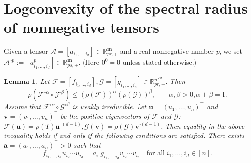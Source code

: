 \documentclass{amsart}
\newcommand{\R}{\mathbb{R}}
\newcommand{\m}{\mathbf{m}}
\newcommand{\uu}{\mathbf{u}}
\newcommand{\bv}{\mathbf{v}}
\newcommand{\0}{\mathbf{0}}
\newcommand{\1}{\mathbf{1}}
\newcommand{\cA}{\mathcal{A}}
\newcommand{\cF}{\mathcal{F}}
\newcommand{\cG}{\mathcal{G}}
\newcommand{\trans}{^\top}
\newtheorem{lemma}[theo]{Lemma}
\theoremstyle{remark}
\numberwithin{equation}{section} %
\renewcommand{\le}{\leqslant}
\begin{document}
%
 \section{Logconvexity of the spectral radius of nonnegative tensors}\label{sec:logconv}
  Given a tensor $\cA=[a_{i_1,\ldots,i_d}]\in \R_{pr,+}^{\m}$ and a real nonnegative number $p$, we set $\cA^{\circ p}:=[a_{i_1,\ldots,i_d}^p]\in \R_{ps,+}^{\m}$.
 (Here $0^0=0$ unless stated otherwise.)
 \begin{lemma}\label{genkinin}
 Let $\cF=[f_{i_1,\ldots,i_d}],\cG=[g_{i_1,\ldots,i_d}]\in\R_{pr,+}^{n^{\times d}}$.  Then
 \begin{equation}\label{genkinin1}
 \rho(\cF^{\circ \alpha}\circ\cG^{\circ\beta})\le (\rho(\cF))^\alpha (\rho(\cG))^\beta,\qquad  \alpha,\beta> 0, \alpha+\beta=1.
 \end{equation}
 Assume that $\cF^{\circ \alpha}\circ\cG^{\circ\beta}$ is weakly irreducible.  Let  $\uu=(u_1,\ldots,u_n)\trans$ and $\bv=(v_1,\ldots,v_n)\trans$ be the positive eigenvectors of $\cF$ and $\cG$: $\cF(\uu)=\rho(T)\uu^{\circ(d-1) }, \cG(\bv)=\rho(\cG)\bv^{\circ(d-1)}$.  Then  equality in the above inequality holds if and only if the following conditions are satisfied. There exists $\mathbf{a}=(a_1,\ldots,a_n)\trans >0$ such that
 \begin{equation}\label{eqcondlogconsr}
 f_{i_1,\ldots,i_d}u_{i_2}\cdots u_{i_d}=a_{i_1}g_{i_1,\ldots,i_d}v_{i_2}\cdots v_{i_d} \quad \textrm{for all } i_1,\ldots,i_d\in[n].
 \end{equation}
 \end{lemma}
\end{document}
